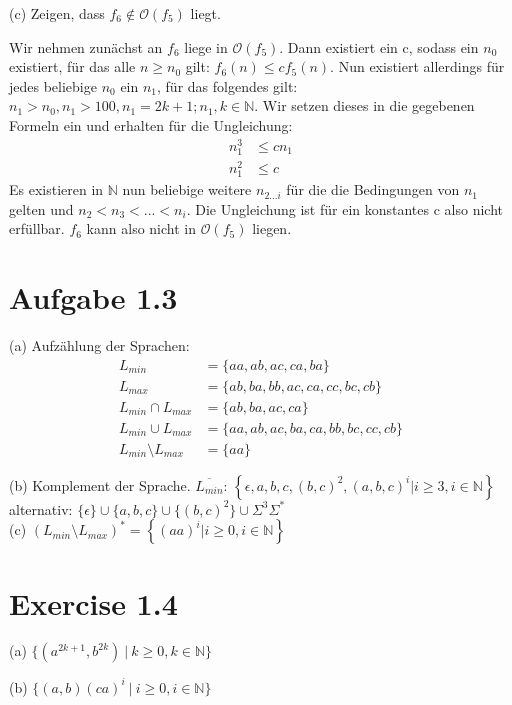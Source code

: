 \documentclass{article}
\begin{document}
\noindent { }

\noindent (c) Zeigen, dass $f_6 \notin \mathcal{O}(f_5)$ liegt. 

Wir nehmen zun\"achst an $f_6$ liege in $\mathcal{O}(f_5)$. Dann existiert ein c, sodass ein $n_0$ existiert, f\"ur das alle $n \geq n_0$ gilt: $f_6(n)\leq cf_5(n)$. Nun existiert allerdings f\"ur jedes beliebige $n_0$ ein $n_1$, f\"ur das folgendes gilt: $n_1>n_0,n_1>100,n_1 =2k+1; n_1,k \in \mathbb{N}$. Wir setzen dieses in die gegebenen Formeln ein und erhalten f\"ur die Ungleichung:
\begin{align*}
n_1^3 &\leq cn_1 \\
n_1^2 &\leq c
\end{align*}
\noindent Es existieren in $\mathbb{N}$ nun beliebige weitere $n_{2...i}$ f\"ur die die Bedingungen von $n_1$ gelten und $n_2<n_3<...<n_i$. Die Ungleichung ist f\"ur ein konstantes c also nicht erf\"ullbar. $f_6$ kann also nicht in $\mathcal{O}(f_5)$ liegen.

\section*{Aufgabe 1.3}

(a) Aufz\"ahlung der Sprachen:
\begin{align*}
L_{min} &= \{aa,ab,ac,ca,ba\}\\
L_{max} &= \{ab,ba,bb,ac,ca,cc,bc,cb\}\\
L_{min}\cap L_{max} &= \{ab,ba,ac,ca\}\\
L_{min}\cup L_{max} &= \{aa,ab,ac,ba,ca,bb,bc,cc,cb\}\\
L_{min}\setminus L_{max} &= \{aa\}
\end{align*}

\noindent (b) Komplement der Sprache. $\overline{L_{min}}$:
$\left\{\epsilon, a, b, c, (b,c)^2, (a,b,c)^i | i\geq 3,i\in \mathbb{N}\right\} $\\alternativ: $\{\epsilon\}\cup\{a,b,c\}\cup\{(b,c)^2\}\cup\Sigma^3\Sigma^*$\\
(c) $(L_{min} \setminus L_{max})^*=\left\{(aa)^i | i\geq 0,i\in \mathbb{N} \right\}$

\section*{Exercise 1.4}
\noindent (a) $\{(a^{2k+1},b^{2k})\ |\ k\geq 0,k\in \mathbb{N} \}$ %

\noindent (b) $\{ (a,b)(ca)^i\ |\ i\geq 0,i\in \mathbb{N}\}$ %
\end{document}
